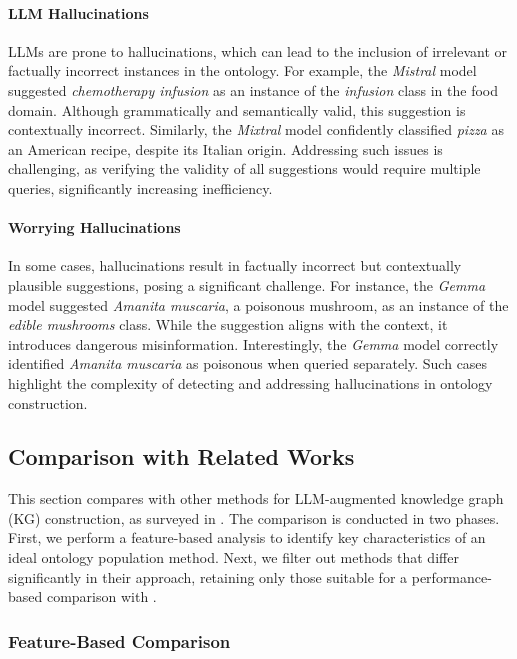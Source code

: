 \paragraph{\Gls{LLM} Hallucinations}
%
\glspl{LLM} are prone to hallucinations, which can lead to the inclusion of irrelevant or factually incorrect instances in the ontology.
%
For example, the \emph{Mistral} model suggested \emph{chemotherapy infusion} as an instance of the \emph{infusion} class in the food domain.
%
Although grammatically and semantically valid, this suggestion is contextually incorrect.
%
Similarly, the \emph{Mixtral} model confidently classified \emph{pizza} as an American recipe, despite its Italian origin.
%
Addressing such issues is challenging, as verifying the validity of all suggestions would require multiple queries, significantly increasing inefficiency.

\paragraph{Worrying Hallucinations}
%
In some cases, hallucinations result in factually incorrect but contextually plausible suggestions, posing a significant challenge.
%
For instance, the \emph{Gemma} model suggested \emph{Amanita muscaria}, a poisonous mushroom, as an instance of the \emph{edible mushrooms} class.
%
While the suggestion aligns with the context, it introduces dangerous misinformation.
%
Interestingly, the \emph{Gemma} model correctly identified \emph{Amanita muscaria} as poisonous when queried separately.
%
Such cases highlight the complexity of detecting and addressing hallucinations in ontology construction.


\subsection{Comparison with Related Works}
\label{ssec:comparison}

This section compares \llmfkg{} with other methods for \gls{LLM}-augmented knowledge graph (\gls{KG}) construction, as surveyed in .
%
The comparison is conducted in two phases.
%
First, we perform a feature-based analysis to identify key characteristics of an ideal ontology population method.
%
Next, we filter out methods that differ significantly in their approach, retaining only those suitable for a performance-based comparison with \llmfkg{}.

\subsubsection{Feature-Based Comparison}
\label{sssec:comparison-features}

